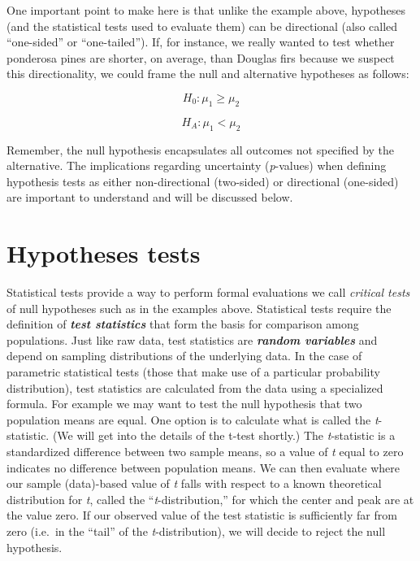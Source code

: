 \documentclass[]{book}
\begin{document}
One important point to make here is that unlike the example above, hypotheses (and the statistical tests used to evaluate them) can be directional (also called ``one-sided'' or ``one-tailed''). If, for instance, we really wanted to test whether ponderosa pines are shorter, on average, than Douglas firs because we suspect this directionality, we could frame the null and alternative hypotheses as follows:

\[H_0 : \mu_1 \geq \mu_2\]

\[H_A: \mu_1 < \mu_2\]

Remember, the null hypothesis encapsulates all outcomes not specified by the alternative. The implications regarding uncertainty (\emph{p}-values) when defining hypothesis tests as either non-directional (two-sided) or directional (one-sided) are important to understand and will be discussed below.

\hypertarget{hypotheses-tests}{%
\section{Hypotheses tests}\label{hypotheses-tests}}

Statistical tests provide a way to perform formal evaluations we call \emph{critical tests} of null hypotheses such as in the examples above. Statistical tests require the definition of \textbf{\emph{test statistics}} that form the basis for comparison among populations. Just like raw data, test statistics are \textbf{\emph{random variables}} and depend on sampling distributions of the underlying data. In the case of parametric statistical tests (those that make use of a particular probability distribution), test statistics are calculated from the data using a specialized formula. For example we may want to test the null hypothesis that two population means are equal. One option is to calculate what is called the \emph{t}-statistic. (We will get into the details of the t-test shortly.) The \emph{t}-statistic is a standardized difference between two sample means, so a value of \emph{t} equal to zero indicates no difference between population means. We can then evaluate where our sample (data)-based value of \emph{t} falls with respect to a known theoretical distribution for \emph{t}, called the ``\emph{t}-distribution,'' for which the center and peak are at the value zero. If our observed value of the test statistic is sufficiently far from zero (i.e.~in the ``tail'' of the \emph{t}-distribution), we will decide to reject the null hypothesis.
\end{document}
